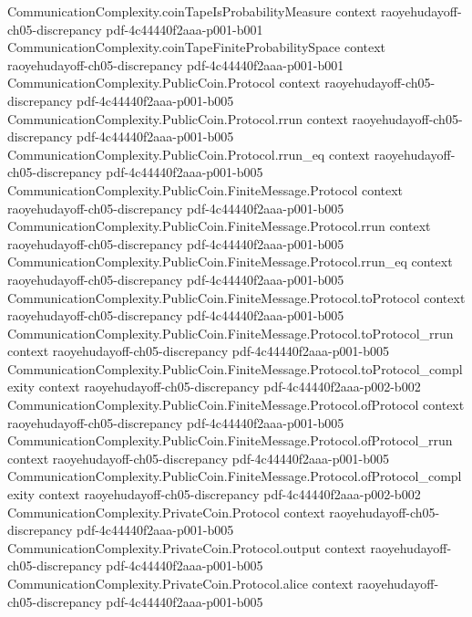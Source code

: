 \begin{lemma}
\proofstep
  {CommunicationComplexity.coinTapeIsProbabilityMeasure}
  {context}
  {raoyehudayoff-ch05-discrepancy}
  {pdf-4c44440f2aaa-p001-b001}
\proofstep
  {CommunicationComplexity.coinTapeFiniteProbabilitySpace}
  {context}
  {raoyehudayoff-ch05-discrepancy}
  {pdf-4c44440f2aaa-p001-b001}
\proofstep
  {CommunicationComplexity.PublicCoin.Protocol}
  {context}
  {raoyehudayoff-ch05-discrepancy}
  {pdf-4c44440f2aaa-p001-b005}
\proofstep
  {CommunicationComplexity.PublicCoin.Protocol.rrun}
  {context}
  {raoyehudayoff-ch05-discrepancy}
  {pdf-4c44440f2aaa-p001-b005}
\proofstep
  {CommunicationComplexity.PublicCoin.Protocol.rrun_eq}
  {context}
  {raoyehudayoff-ch05-discrepancy}
  {pdf-4c44440f2aaa-p001-b005}
\proofstep
  {CommunicationComplexity.PublicCoin.FiniteMessage.Protocol}
  {context}
  {raoyehudayoff-ch05-discrepancy}
  {pdf-4c44440f2aaa-p001-b005}
\proofstep
  {CommunicationComplexity.PublicCoin.FiniteMessage.Protocol.rrun}
  {context}
  {raoyehudayoff-ch05-discrepancy}
  {pdf-4c44440f2aaa-p001-b005}
\proofstep
  {CommunicationComplexity.PublicCoin.FiniteMessage.Protocol.rrun_eq}
  {context}
  {raoyehudayoff-ch05-discrepancy}
  {pdf-4c44440f2aaa-p001-b005}
\proofstep
  {CommunicationComplexity.PublicCoin.FiniteMessage.Protocol.toProtocol}
  {context}
  {raoyehudayoff-ch05-discrepancy}
  {pdf-4c44440f2aaa-p001-b005}
\proofstep
  {CommunicationComplexity.PublicCoin.FiniteMessage.Protocol.toProtocol_rrun}
  {context}
  {raoyehudayoff-ch05-discrepancy}
  {pdf-4c44440f2aaa-p001-b005}
\proofstep
  {CommunicationComplexity.PublicCoin.FiniteMessage.Protocol.toProtocol_complexity}
  {context}
  {raoyehudayoff-ch05-discrepancy}
  {pdf-4c44440f2aaa-p002-b002}
\proofstep
  {CommunicationComplexity.PublicCoin.FiniteMessage.Protocol.ofProtocol}
  {context}
  {raoyehudayoff-ch05-discrepancy}
  {pdf-4c44440f2aaa-p001-b005}
\proofstep
  {CommunicationComplexity.PublicCoin.FiniteMessage.Protocol.ofProtocol_rrun}
  {context}
  {raoyehudayoff-ch05-discrepancy}
  {pdf-4c44440f2aaa-p001-b005}
\proofstep
  {CommunicationComplexity.PublicCoin.FiniteMessage.Protocol.ofProtocol_complexity}
  {context}
  {raoyehudayoff-ch05-discrepancy}
  {pdf-4c44440f2aaa-p002-b002}
\proofstep
  {CommunicationComplexity.PrivateCoin.Protocol}
  {context}
  {raoyehudayoff-ch05-discrepancy}
  {pdf-4c44440f2aaa-p001-b005}
\proofstep
  {CommunicationComplexity.PrivateCoin.Protocol.output}
  {context}
  {raoyehudayoff-ch05-discrepancy}
  {pdf-4c44440f2aaa-p001-b005}
\proofstep
  {CommunicationComplexity.PrivateCoin.Protocol.alice}
  {context}
  {raoyehudayoff-ch05-discrepancy}
  {pdf-4c44440f2aaa-p001-b005}

\end{lemma}
